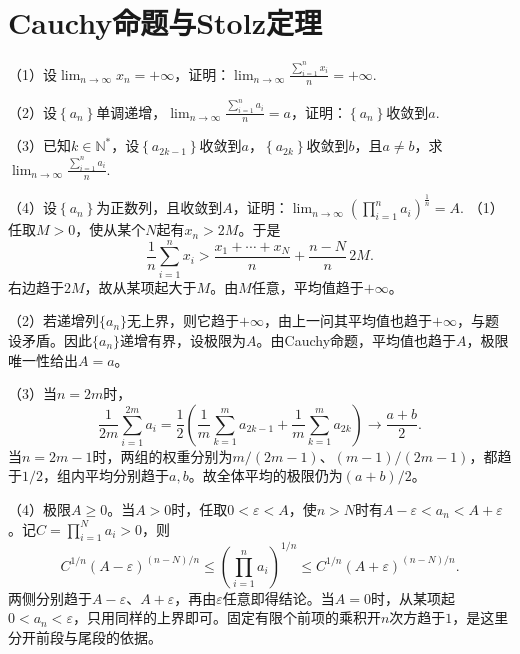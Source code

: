 \par\addvspace{12pt}

\section{Cauchy命题与Stolz定理}

\label{sol:sec:analysis:5}

（1）设\(\lim_{n \to \infty} x_{n} = + \infty\)，证明：\(\lim_{n \to \infty} \frac{\sum _{i = 1}^{n} x_{i}}{n} = + \infty\).

    （2）设\(\left\{ a_{n} \right\}\)单调递增，\(\lim_{n \to \infty} \frac{\sum _{i = 1}^{n} a_{i}}{n} = a\)，证明：\(\left\{ a_{n} \right\}\)收敛到\(a\).

    （3）已知\(k \in \mathbb{N}^{*}\)，设\(\left\{ a_{2 k - 1} \right\}\)收敛到\(a\)，\(\left\{ a_{2 k} \right\}\)收敛到\(b\)，且\(a \ne b\)，求\(\lim_{n \to \infty} \frac{\sum _{i = 1}^{n} a_{i}}{n}\).

    （4）设\(\left\{ a_{n} \right\}\)为正数列，且收敛到\(A\)，证明：\(\lim_{n \to \infty} {\left( \prod _{i = 1}^{n} a_{i} \right)}^{\frac{1}{n}} = A\).
\solutionanswer
（1）任取\(M>0\)，使从某个\(N\)起有\(x_n>2M\)。于是
\[
\frac1n\sum_{i=1}^nx_i>\frac{x_1+\cdots+x_N}{n}+\frac{n-N}{n}\,2M.
\]
右边趋于\(2M\)，故从某项起大于\(M\)。由\(M\)任意，平均值趋于\(+\infty\)。

（2）若递增列\(\{a_n\}\)无上界，则它趋于\(+\infty\)，由上一问其平均值也趋于\(+\infty\)，与题设矛盾。因此\(\{a_n\}\)递增有界，设极限为\(A\)。由Cauchy命题，平均值也趋于\(A\)，极限唯一性给出\(A=a\)。

（3）当\(n=2m\)时，
\[
\frac1{2m}\sum_{i=1}^{2m}a_i
=\frac12\left(\frac1m\sum_{k=1}^ma_{2k-1}+\frac1m\sum_{k=1}^ma_{2k}\right)\to\frac{a+b}2.
\]
当\(n=2m-1\)时，两组的权重分别为\(m/(2m-1)\)、\((m-1)/(2m-1)\)，都趋于\(1/2\)，组内平均分别趋于\(a,b\)。故全体平均的极限仍为\((a+b)/2\)。

（4）极限\(A\ge0\)。当\(A>0\)时，任取\(0<\varepsilon<A\)，使\(n>N\)时有\(A-\varepsilon<a_n<A+\varepsilon\)。记\(C=\prod_{i=1}^Na_i>0\)，则
\[
C^{1/n}(A-\varepsilon)^{(n-N)/n}
\le\left(\prod_{i=1}^na_i\right)^{1/n}
\le C^{1/n}(A+\varepsilon)^{(n-N)/n}.
\]
两侧分别趋于\(A-\varepsilon\)、\(A+\varepsilon\)，再由\(\varepsilon\)任意即得结论。当\(A=0\)时，从某项起\(0<a_n<\varepsilon\)，只用同样的上界即可。固定有限个前项的乘积开\(n\)次方趋于\(1\)，是这里分开前段与尾段的依据。


